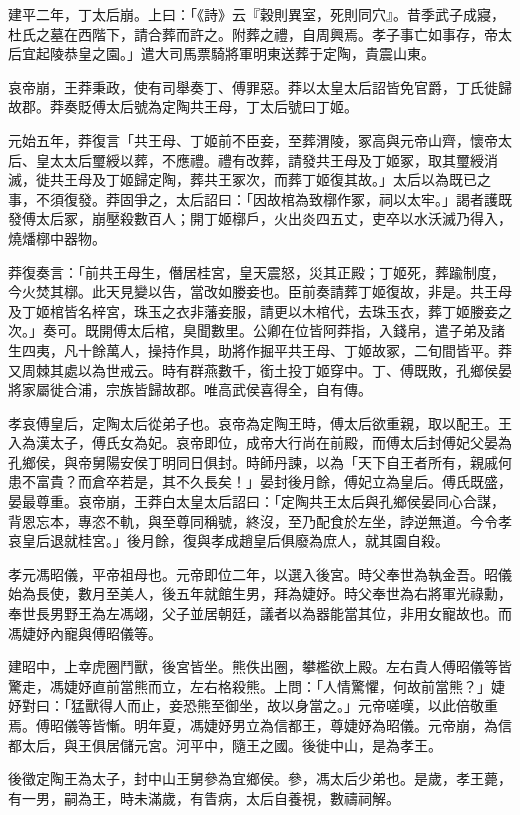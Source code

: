 \begin{pinyinscope}
建平二年，丁太后崩。上曰：「《詩》云『穀則異室，死則同穴』。昔季武子成寢，杜氏之墓在西階下，請合葬而許之。附葬之禮，自周興焉。孝子事亡如事存，帝太后宜起陵恭皇之園。」遣大司馬票騎將軍明東送葬于定陶，貴震山東。

哀帝崩，王莽秉政，使有司舉奏丁、傅罪惡。莽以太皇太后詔皆免官爵，丁氏徙歸故郡。莽奏貶傅太后號為定陶共王母，丁太后號曰丁姬。

元始五年，莽復言「共王母、丁姬前不臣妾，至葬渭陵，冢高與元帝山齊，懷帝太后、皇太太后璽綬以葬，不應禮。禮有改葬，請發共王母及丁姬冢，取其璽綬消滅，徙共王母及丁姬歸定陶，葬共王冢次，而葬丁姬復其故。」太后以為既已之事，不須復發。莽固爭之，太后詔曰：「因故棺為致槨作冢，祠以太牢。」謁者護既發傅太后冢，崩壓殺數百人；開丁姬槨戶，火出炎四五丈，吏卒以水沃滅乃得入，燒燔槨中器物。

莽復奏言：「前共王母生，僭居桂宮，皇天震怒，災其正殿；丁姬死，葬踰制度，今火焚其槨。此天見變以告，當改如媵妾也。臣前奏請葬丁姬復故，非是。共王母及丁姬棺皆名梓宮，珠玉之衣非藩妾服，請更以木棺代，去珠玉衣，葬丁姬媵妾之次。」奏可。既開傅太后棺，臭聞數里。公卿在位皆阿莽指，入錢帛，遣子弟及諸生四夷，凡十餘萬人，操持作具，助將作掘平共王母、丁姬故冢，二旬間皆平。莽又周棘其處以為世戒云。時有群燕數千，銜土投丁姬穿中。丁、傅既敗，孔鄉侯晏將家屬徙合浦，宗族皆歸故郡。唯高武侯喜得全，自有傳。

孝哀傅皇后，定陶太后從弟子也。哀帝為定陶王時，傅太后欲重親，取以配王。王入為漢太子，傅氏女為妃。哀帝即位，成帝大行尚在前殿，而傅太后封傅妃父晏為孔鄉侯，與帝舅陽安侯丁明同日俱封。時師丹諫，以為「天下自王者所有，親戚何患不富貴？而倉卒若是，其不久長矣！」晏封後月餘，傅妃立為皇后。傅氏既盛，晏最尊重。哀帝崩，王莽白太皇太后詔曰：「定陶共王太后與孔鄉侯晏同心合謀，背恩忘本，專恣不軌，與至尊同稱號，終沒，至乃配食於左坐，誖逆無道。今令孝哀皇后退就桂宮。」後月餘，復與孝成趙皇后俱廢為庶人，就其園自殺。

孝元馮昭儀，平帝祖母也。元帝即位二年，以選入後宮。時父奉世為執金吾。昭儀始為長使，數月至美人，後五年就館生男，拜為婕妤。時父奉世為右將軍光祿勳，奉世長男野王為左馮翊，父子並居朝廷，議者以為器能當其位，非用女寵故也。而馮婕妤內寵與傅昭儀等。

建昭中，上幸虎圈鬥獸，後宮皆坐。熊佚出圈，攀檻欲上殿。左右貴人傅昭儀等皆驚走，馮婕妤直前當熊而立，左右格殺熊。上問：「人情驚懼，何故前當熊？」婕妤對曰：「猛獸得人而止，妾恐熊至御坐，故以身當之。」元帝嗟嘆，以此倍敬重焉。傅昭儀等皆慚。明年夏，馮婕妤男立為信都王，尊婕妤為昭儀。元帝崩，為信都太后，與王俱居儲元宮。河平中，隨王之國。後徙中山，是為孝王。

後徵定陶王為太子，封中山王舅參為宜鄉侯。參，馮太后少弟也。是歲，孝王薨，有一男，嗣為王，時未滿歲，有眚病，太后自養視，數禱祠解。


\end{pinyinscope}
